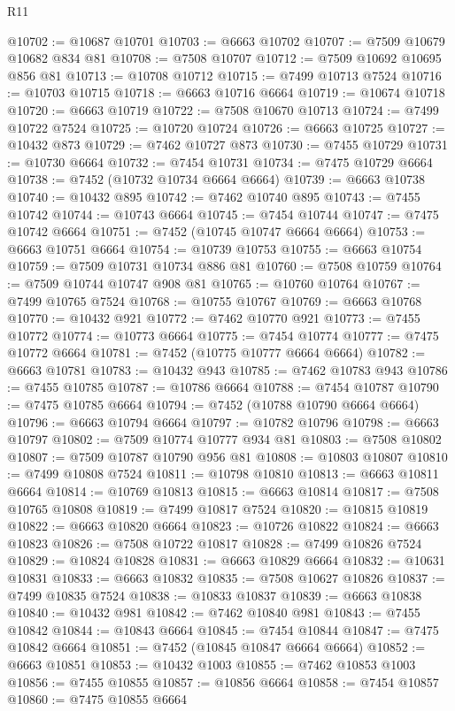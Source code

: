 \begin{lexlean}{R11}
\begin{coremodule}
{{{{{{{{{{{{{{{{{{{{{{{{{{{{{{{{{{{{{{{{{{{{{{{{{{{{{{{{{{{{{{{{{{{{{{{{{{{{{{{{{{@10702 := @10687 @10701
@10703 := @6663 @10702
@10707 := @7509 @10679 @10682 @834 @81
@10708 := @7508 @10707
@10712 := @7509 @10692 @10695 @856 @81
@10713 := @10708 @10712
@10715 := @7499 @10713 @7524
@10716 := @10703 @10715
@10718 := @6663 @10716 @6664
@10719 := @10674 @10718
@10720 := @6663 @10719
@10722 := @7508 @10670 @10713
@10724 := @7499 @10722 @7524
@10725 := @10720 @10724
@10726 := @6663 @10725
@10727 := @10432 @873
@10729 := @7462 @10727 @873
@10730 := @7455 @10729
@10731 := @10730 @6664
@10732 := @7454 @10731
@10734 := @7475 @10729 @6664
@10738 := @7452 (@10732 @10734 @6664 @6664)
@10739 := @6663 @10738
@10740 := @10432 @895
@10742 := @7462 @10740 @895
@10743 := @7455 @10742
@10744 := @10743 @6664
@10745 := @7454 @10744
@10747 := @7475 @10742 @6664
@10751 := @7452 (@10745 @10747 @6664 @6664)
@10753 := @6663 @10751 @6664
@10754 := @10739 @10753
@10755 := @6663 @10754
@10759 := @7509 @10731 @10734 @886 @81
@10760 := @7508 @10759
@10764 := @7509 @10744 @10747 @908 @81
@10765 := @10760 @10764
@10767 := @7499 @10765 @7524
@10768 := @10755 @10767
@10769 := @6663 @10768
@10770 := @10432 @921
@10772 := @7462 @10770 @921
@10773 := @7455 @10772
@10774 := @10773 @6664
@10775 := @7454 @10774
@10777 := @7475 @10772 @6664
@10781 := @7452 (@10775 @10777 @6664 @6664)
@10782 := @6663 @10781
@10783 := @10432 @943
@10785 := @7462 @10783 @943
@10786 := @7455 @10785
@10787 := @10786 @6664
@10788 := @7454 @10787
@10790 := @7475 @10785 @6664
@10794 := @7452 (@10788 @10790 @6664 @6664)
@10796 := @6663 @10794 @6664
@10797 := @10782 @10796
@10798 := @6663 @10797
@10802 := @7509 @10774 @10777 @934 @81
@10803 := @7508 @10802
@10807 := @7509 @10787 @10790 @956 @81
@10808 := @10803 @10807
@10810 := @7499 @10808 @7524
@10811 := @10798 @10810
@10813 := @6663 @10811 @6664
@10814 := @10769 @10813
@10815 := @6663 @10814
@10817 := @7508 @10765 @10808
@10819 := @7499 @10817 @7524
@10820 := @10815 @10819
@10822 := @6663 @10820 @6664
@10823 := @10726 @10822
@10824 := @6663 @10823
@10826 := @7508 @10722 @10817
@10828 := @7499 @10826 @7524
@10829 := @10824 @10828
@10831 := @6663 @10829 @6664
@10832 := @10631 @10831
@10833 := @6663 @10832
@10835 := @7508 @10627 @10826
@10837 := @7499 @10835 @7524
@10838 := @10833 @10837
@10839 := @6663 @10838
@10840 := @10432 @981
@10842 := @7462 @10840 @981
@10843 := @7455 @10842
@10844 := @10843 @6664
@10845 := @7454 @10844
@10847 := @7475 @10842 @6664
@10851 := @7452 (@10845 @10847 @6664 @6664)
@10852 := @6663 @10851
@10853 := @10432 @1003
@10855 := @7462 @10853 @1003
@10856 := @7455 @10855
@10857 := @10856 @6664
@10858 := @7454 @10857
@10860 := @7475 @10855 @6664
}}}}}}}}}}}}}}}}}}}}}}}}}}}}}}}}}}}}}}}}}}}}}}}}}}}}}}}}}}}}}}}}}}}}}}}}}}}}}}}}}}
\end{coremodule}
\end{lexlean}
